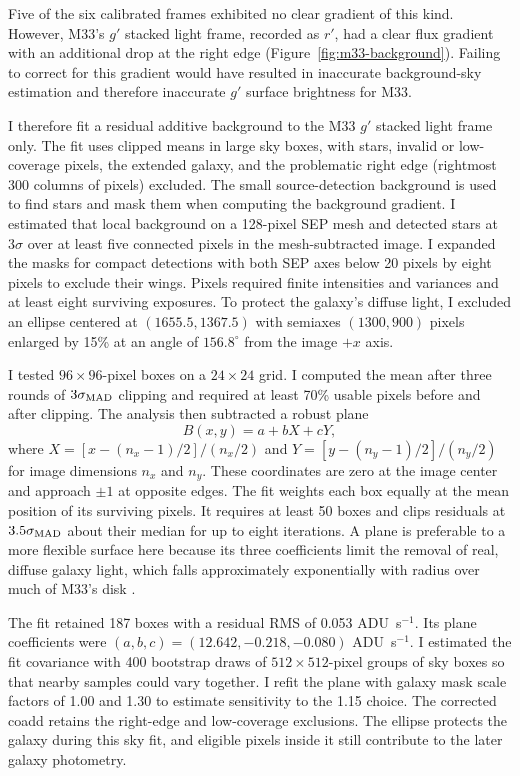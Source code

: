 Five of the six calibrated frames exhibited no clear gradient of this kind. However, M33's $g'$ stacked light frame, recorded as $r'$, had a clear flux gradient with an additional drop at the right edge (Figure~\ref{fig:m33-background}). Failing to correct for this gradient would have resulted in inaccurate background-sky estimation and therefore inaccurate $g'$ surface brightness for M33.

I therefore fit a residual additive background to the M33 $g'$ stacked light frame only. The fit uses clipped means in large sky boxes, with stars, invalid or low-coverage pixels, the extended galaxy, and the problematic right edge (rightmost 300 columns of pixels) excluded. The small source-detection background is used to find stars and mask them when computing the background gradient. I estimated that local background on a 128-pixel SEP mesh and detected stars at $3\sigma$ over at least five connected pixels in the mesh-subtracted image. I expanded the masks for compact detections with both SEP axes below 20 pixels by eight pixels to exclude their wings. Pixels required finite intensities and variances and at least eight surviving exposures. To protect the galaxy's diffuse light, I excluded an ellipse centered at $(1655.5,1367.5)$ with semiaxes $(1300,900)$ pixels enlarged by 15\% at an angle of $156.8^{\circ}$ from the image $+x$ axis.

I tested $96\times96$-pixel boxes on a $24\times24$ grid. I computed the mean after three rounds of $3\sigma_{\rm MAD}$ clipping and required at least 70\% usable pixels before and after clipping. The analysis then subtracted a robust plane
\begin{equation}
    B(x,y)=a+bX+cY,
    \label{eq:bg-plane}
\end{equation}
where $X=[x-(n_x-1)/2]/(n_x/2)$ and $Y=[y-(n_y-1)/2]/(n_y/2)$ for image dimensions $n_x$ and $n_y$. These coordinates are zero at the image center and approach $\pm1$ at opposite edges. The fit weights each box equally at the mean position of its surviving pixels. It requires at least 50 boxes and clips residuals at $3.5\sigma_{\rm MAD}$ about their median for up to eight iterations. A plane is preferable to a more flexible surface here because its three coefficients limit the removal of real, diffuse galaxy light, which falls approximately exponentially with radius over much of M33's disk \citep{methKent}.

The fit retained 187 boxes with a residual RMS of 0.053 ADU~s$^{-1}$. Its plane coefficients were $(a,b,c)=(12.642,-0.218,-0.080)$ ADU~s$^{-1}$. I estimated the fit covariance with 400 bootstrap draws of $512\times512$-pixel groups of sky boxes so that nearby samples could vary together. I refit the plane with galaxy mask scale factors of 1.00 and 1.30 to estimate sensitivity to the 1.15 choice. The corrected coadd retains the right-edge and low-coverage exclusions. The ellipse protects the galaxy during this sky fit, and eligible pixels inside it still contribute to the later galaxy photometry.

